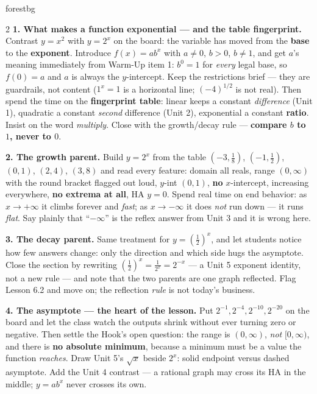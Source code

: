 \documentclass[10pt]{article}
\begin{document}
\begin{skillbox}[Lesson]{forestbg}
\begin{multicols}{2}
\textbf{1. What makes a function exponential --- and the table fingerprint.} Contrast $y=x^{2}$ with
$y=2^{x}$ on the board: the variable has moved from the \textbf{base} to the \textbf{exponent}.
Introduce $f(x)=ab^{x}$ with $a\ne0$, $b>0$, $b\ne1$, and get $a$'s meaning immediately from
Warm-Up item 1: $b^{0}=1$ for \emph{every} legal base, so $f(0)=a$ and $a$ is always the
$y$-intercept. Keep the restrictions brief --- they are guardrails, not content ($1^{x}=1$ is a
horizontal line; $(-4)^{1/2}$ is not real). Then spend the time on the \textbf{fingerprint table}:
linear keeps a constant \emph{difference} (Unit 1), quadratic a constant \emph{second} difference
(Unit 2), exponential a constant \textbf{ratio}. Insist on the word \emph{multiply}. Close with the
growth/decay rule --- \textbf{compare $b$ to $1$, never to $0$}.

\textbf{2. The growth parent.} Build $y=2^{x}$ from the table $(-3,\frac18)$, $(-1,\frac12)$,
$(0,1)$, $(2,4)$, $(3,8)$ and read every feature: domain all reals, range $(0,\infty)$ with the
round bracket flagged out loud, $y$-int $(0,1)$, \textbf{no} $x$-intercept, increasing everywhere,
\textbf{no extrema at all}, HA $y=0$. Spend real time on end behavior: as $x\to+\infty$ it climbs
forever and \emph{fast}; as $x\to-\infty$ it does \emph{not} run down --- it runs \emph{flat}. Say
plainly that ``$-\infty$'' is the reflex answer from Unit 3 and it is wrong here.

\columnbreak

\textbf{3. The decay parent.} Same treatment for $y=\left(\frac12\right)^{x}$, and let students
notice how few answers change: only the direction and which side hugs the asymptote. Close the
section by rewriting $\left(\frac12\right)^{x}=\frac{1}{2^{x}}=2^{-x}$ --- a Unit 5 exponent
identity, not a new rule --- and note that the two parents are one graph reflected. Flag Lesson 6.2
and move on; the reflection \emph{rule} is not today's business.

\textbf{4. The asymptote --- the heart of the lesson.} Put $2^{-1}, 2^{-4}, 2^{-10}, 2^{-20}$ on the
board and let the class watch the outputs shrink without ever turning zero or negative. Then settle
the Hook's open question: the range is $(0,\infty)$, \emph{not} $[0,\infty)$, and there is
\textbf{no absolute minimum}, because a minimum must be a value the function \emph{reaches}. Draw
Unit 5's $\sqrt{x}$ beside $2^{x}$: solid endpoint versus dashed asymptote. Add the Unit 4 contrast
--- a rational graph may cross its HA in the middle; $y=ab^{x}$ never crosses its own.


\end{multicols}
\end{skillbox}
\end{document}

